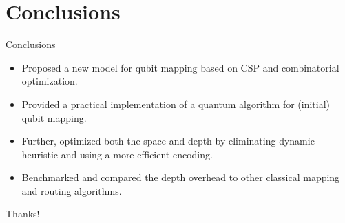 \documentclass{beamer}
\begin{document}
\section{Conclusions}
\begin{frame}{Conclusions}\pause
\begin{itemize}
	\item Proposed a new model for qubit mapping based on CSP and combinatorial optimization. \pause
	\item Provided a practical implementation of a quantum algorithm for (initial) qubit mapping. \pause
	\item Further, optimized both the space and depth by eliminating dynamic heuristic and using a more efficient encoding. \pause
	\item Benchmarked and compared the depth overhead to other classical mapping and routing algorithms.
\end{itemize}

\end{frame}

\begin{frame}
 \begin{center}
  Thanks!
 \end{center}

\end{frame}
\end{document}
